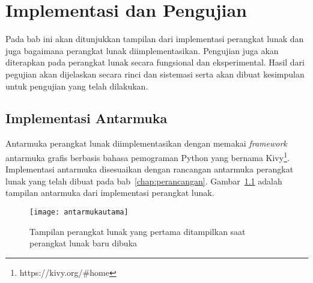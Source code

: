 \chapter{Implementasi dan Pengujian}
\label{chap:Implementasi}

Pada bab ini akan ditunjukkan tampilan dari implementasi perangkat lunak dan juga bagaimana perangkat lunak diimplementasikan. Pengujian juga akan diterapkan pada perangkat lunak secara fungsional dan eksperimental. Hasil dari pegujian akan dijelaskan secara rinci dan sistemasi serta akan dibuat kesimpulan untuk pengujian yang telah dilakukan.







\section{Implementasi Antarmuka}
\label{sec:implementasi-antarmuka}

Antarmuka perangkat lunak diimplementasikan dengan memakai \textit{framework} antarmuka grafis berbasis bahasa pemograman Python yang bernama Kivy\footnote{https://kivy.org/\#home}. Implementasi antarmuka disesuaikan dengan rancangan antarmuka perangkat lunak yang telah dibuat pada bab~\ref{chap:perancangan}. Gambar~\ref{fig:antarmukautama} adalah tampilan antarmuka dari implementasi perangkat lunak.

\begin{figure}
	\centering
	\texttt{[image: antarmukautama]}
	\caption{Tampilan perangkat lunak yang pertama ditampilkan saat perangkat lunak baru dibuka}
	\label{fig:antarmukautama}
\end{figure}

